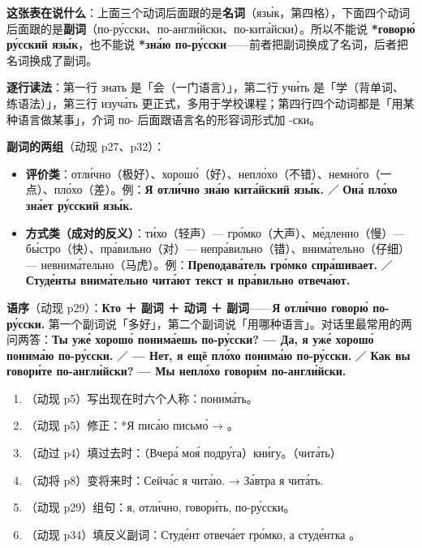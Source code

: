 \textbf{这张表在说什么}：上面三个动词后面跟的是\textbf{名词}（язы́к，第四格），下面四个动词后面跟的是\textbf{副词}（по-ру́сски、по-англи́йски、по-кита́йски）。所以不能说 \textbf{*говорю́ ру́сский язы́к}，也不能说 \textbf{*зна́ю по-ру́сски}——前者把副词换成了名词，后者把名词换成了副词。

\textbf{逐行读法}：第一行 знать 是「会（一门语言）」，第二行 учи́ть 是「学（背单词、练语法）」，第三行 изуча́ть 更正式，多用于学校课程；第四行四个动词都是「用某种语言做某事」，介词 по- 后面跟语言名的形容词形式加 -ски。


\textbf{副词的两组}（动现 p27、p32）：

\begin{itemize}
\item \textbf{评价类}：отли́чно（极好）、хорошо́（好）、непло́хо（不错）、немно́го（一点）、пло́хо（差）。例：\textbf{Я отли́чно зна́ю кита́йский язы́к.} ／ \textbf{Она́ пло́хо зна́ет ру́сский язы́к.}
\item \textbf{方式类（成对的反义）}：ти́хо（轻声）— гро́мко（大声）、ме́дленно（慢）— бы́стро（快）、пра́вильно（对）— непра́вильно（错）、внима́тельно（仔细）— невнима́тельно（马虎）。例：\textbf{Преподава́тель гро́мко спра́шивает.} ／ \textbf{Студе́нты внима́тельно чита́ют текст и пра́вильно отвеча́ют.}
\end{itemize}

\textbf{语序}（动现 p29）：\textbf{Кто ＋ 副词 ＋ 动词 ＋ 副词}——\textbf{Я отли́чно говорю́ по-ру́сски.} 第一个副词说「多好」，第二个副词说「用哪种语言」。对话里最常用的两问两答：\textbf{Ты уже́ хорошо́ понима́ешь по-ру́сски? — Да, я уже́ хорошо́ понима́ю по-ру́сски.} ／ \textbf{— Нет, я ещё пло́хо понима́ю по-ру́сски.} ／ \textbf{Как вы говори́те по-англи́йски? — Мы непло́хо говори́м по-англи́йски.}


\begin{enumerate}[label=\textbf{第 \arabic* 题}]
\item （动现 p5）写出现在时六个人称：понима́ть。
\item （动现 p5）修正：*Я писа́ю письмо́ → \blank。
\item （动过 p4）填过去时：（Вчера́ моя́ подру́га）\blank кни́гу。（чита́ть）
\item （动将 p8）变将来时：Сейча́с я чита́ю. → За́втра я \blank чита́ть.
\item （动现 p29）组句：я, отли́чно, говори́ть, по-ру́сски。
\item （动现 p34）填反义副词：Студе́нт отвеча́ет гро́мко, а студе́нтка \blank。
\end{enumerate}

